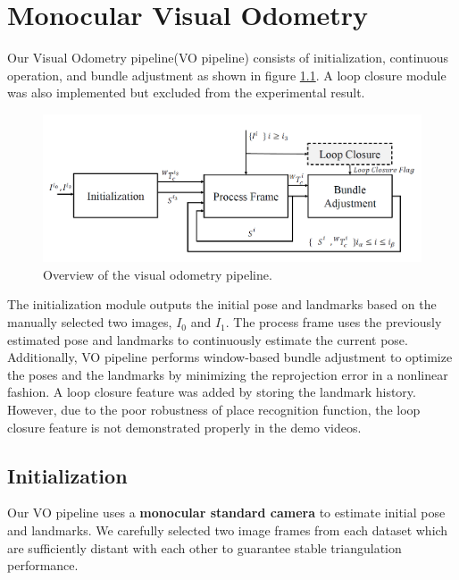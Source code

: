 \chapter{Monocular Visual Odometry}\label{chap:initialization}

Our Visual Odometry pipeline(VO pipeline) consists of initialization, continuous operation, and bundle adjustment as shown in figure \ref{fig:overview}. A loop closure module was also implemented but excluded from the experimental result.

\begin{figure}[h] \label{fig:overview}
\includegraphics[width=\textwidth]{Overview.png}
\caption{Overview of the visual odometry pipeline.}
\end{figure}

The initialization module outputs the initial pose and landmarks based on the manually selected two images, $I_0$ and $I_1$. The process frame uses the previously estimated pose and landmarks to continuously estimate the current pose. Additionally, VO pipeline performs window-based bundle adjustment to optimize the poses and the landmarks by minimizing the reprojection error in a nonlinear fashion. A loop closure feature was added by storing the landmark history. However, due to the poor robustness of place recognition function, the loop closure feature is not demonstrated properly in the demo videos.

\section{Initialization} \label{sec:initialization}

Our VO pipeline uses a \textbf{monocular standard camera} to estimate initial pose and landmarks. We carefully selected two image frames from each dataset which are sufficiently distant with each other to guarantee stable triangulation performance. 

